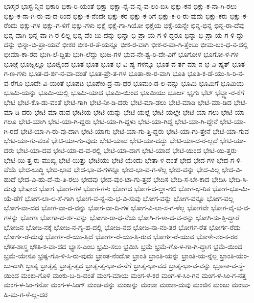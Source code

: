 {ಭಾಸ್ಕರ
ಭಾಸ್ಟ-ನ್ನಿನ
ಭಿಕಾರಿ
ಭಿಕಾ-ರಿ-ಯಂತೆ
ಭಿಕ್ಷಾ
ಭಿಕ್ಷಾ-ನ್ನ-ವ-ನ್ನ-ವ-ಲಂ-ಬಿಸಿ
ಭಿಕ್ಷು-ಕನ
ಭಿಕ್ಷು-ಕ-ನಾ-ಗಿ-ರಲು
ಭಿಕ್ಷು-ಕ-ನಾ-ಗಿ-ರು-ವು-ದ-ರಿಂದ
ಭಿಕ್ಷು-ಕ-ನೆಂದೇ
ಭಿಕ್ಷು-ಕರ
ಭಿಕ್ಷು-ಕ-ರಿಗೆ
ಭಿಕ್ಷು-ಕ-ರಿ-ರು-ವುದು
ಭಿಕ್ಷು-ಕರು
ಭಿಕ್ಷು-ಕ-ರೆಂದು
ಭಿಕ್ಷು-ಗಳ
ಭಿಕ್ಷು-ಗ-ಳಿಗೆ
ಭಿಕ್ಷು-ಗಳು
ಭಿಕ್ಷೆ
ಭಿಕ್ಷೆ-ಗಾ-ಗಿಯೋ
ಭಿಕ್ಷೆಯ
ಭಿಕ್ಷೆ-ಯನ್ನೇ
ಭಿನ್ನ-ಭಿನ್ನ
ಭಿನ್ನ-ರಾ-ದೆವು
ಭಿನ್ನ-ವಾಗಿ
ಭಿನ್ನ-ವಾ-ಗಿ-ರ-ಲಿಲ್ಲ
ಭಿನ್ನ-ವೆಂ-ಬು-ದನ್ನು
ಭಿನ್ನಾ-ಭಿ-ಪ್ರಾ-ಯ-ಗ-ಳಿ-ದ್ದರೂ
ಭಿನ್ನಾ-ಭಿ-ಪ್ರಾ-ಯ-ಗ-ಳಿ-ದ್ದು-ದನ್ನು
ಭಿನ್ನಾ-ಭಿ-ಪ್ರಾ-ಯವೆ
ಭೀಕರ
ಭೀಕ-ರ-ತೆ-ಯನ್ನೂ
ಭೀಕ-ರ-ವಾಗಿ
ಭೀಕ-ರ-ವಾ-ಗಿ-ತ್ತೆಂಬು
ಭೀಮ-ಬಂ-ಧ-ನ-ದಲ್ಲಿ
ಭೀಮಾ-ಕಾ-ರದ
ಭುಗಿ-ಲೆ-ದ್ದಿತು
ಭುಗಿ-ಲೆದ್ದು
ಭುಜ-ಗಳ
ಭುವ-ನೇ-ಶ್ವ-ರಿ-ದೇ-ವಿಗೆ
ಭೂಗೋಳ
ಭೂಗೋ-ಳ-ಗಳ
ಭೂಜ್ಗೆ
ಭೂಜ್ನಲ್ಲೂ
ಭೂಜ್ನಿಂದ
ಭೂತ
ಭೂತ
ಭೂತ-ಭ-ವಿ-ಷ್ಯ-ಗಳನ್ನೂ
ಭೂತ-ವ-ರ್ತ-ಮಾ-ನ-ಭ-ವಿ-ಷ್ಯತ್
ಭೂತ-ಗ-ಣ-ಗಳು
ಭೂತ-ದ-ರ್ಶ-ನ-ವಾ-ದಂತೆ
ಭೂತ-ಪ್ರೇ-ತ-ಗಳ
ಭೂತಾ-ಕಾ-ರ-ವಾಗಿ
ಭೂತಿ
ಭೂತಿ-ಕ-ಡೆ-ಯು-ಸಿ-ರಿ-ನ-ವ-ರೆಗೂ
ಭೂದೇ-ವಿ-ಯಂತೆ
ಭೂಪಟ
ಭೂಪೇಂ-ದ್ರ-ನಾ-ಥರ
ಭೂಮಂ-ಡ-ಲ-ವನ್ನು
ಭೂಮಿ
ಭೂಮಿಗೆ
ಭೂಮಿಯ
ಭೂಮಿ-ಯನ್ನು
ಭೂಮಿ-ಯಲ್ಲಿ
ಭೂಮಿ-ಯಾದ
ಭೂಮಿ-ಯಿಂದ
ಭೂಮಿಯು
ಭೂರ್ಜ
ಭೃಗು
ಭೆಟ್
ಭೆಟ್ದ್ವಾ-ರ-ಕೆಗೆ
ಭೇಟಿ
ಭೇಟಿ-ಕೊ-ಡು-ವಂತೆ
ಭೇಟಿ-ಗಾಗಿ
ಭೇಟಿ-ನೀ-ಡಿ-ದರು
ಭೇಟಿ-ಮಾ-ಡಲು
ಭೇಟಿ-ಮಾಡಿ
ಭೇಟಿ-ಮಾ-ಡಿದ
ಭೇಟಿ-ಮಾ-ಡಿ-ದರು
ಭೇಟಿ-ಮಾ-ಡುವ
ಭೇಟಿಯ
ಭೇಟಿ-ಯನ್ನು
ಭೇಟಿ-ಯಲ್ಲೆ
ಭೇಟಿ-ಯಲ್ಲೇ
ಭೇಟಿ-ಯಾ-ಗಲು
ಭೇಟಿ-ಯಾ-ಗಲೂ
ಭೇಟಿ-ಯಾಗಿ
ಭೇಟಿ-ಯಾ-ಗಿ-ದ್ದರು
ಭೇಟಿ-ಯಾ-ಗಿ-ದ್ದಳು
ಭೇಟಿ-ಯಾ-ಗಿದ್ದೆ
ಭೇಟಿ-ಯಾ-ಗಿ-ದ್ದೇನೆ
ಭೇಟಿ-ಯಾ-ಗಿ-ರದೆ
ಭೇಟಿ-ಯಾ-ಗಿ-ರು-ವು-ದಾಗಿ
ಭೇಟಿ-ಯಾಗು
ಭೇಟಿ-ಯಾ-ಗು-ತ್ತಿ-ದ್ದರು
ಭೇಟಿ-ಯಾ-ಗು-ತ್ತೇನೆ
ಭೇಟಿ-ಯಾ-ಗುವ
ಭೇಟಿ-ಯಾ-ಗು-ವಂತೆ
ಭೇಟಿ-ಯಾ-ಗು-ವುದು
ಭೇಟಿ-ಯಾದ
ಭೇಟಿ-ಯಾ-ದದ್ದು
ಭೇಟಿ-ಯಾ-ದ-ರ-ಲ್ಲದೆ
ಭೇಟಿ-ಯಾ-ದರು
ಭೇಟಿ-ಯಾ-ದವ
ಭೇಟಿ-ಯಾ-ದ-ವ-ರಲ್ಲಿ
ಭೇಟಿ-ಯಾ-ದಾಗ
ಭೇಟಿ-ಯಾದೆ
ಭೇಟಿ-ಯಿಂದ
ಭೇಟಿ-ಯಿ-ತ್ತರು
ಭೇಟಿ-ಯಿ-ತ್ತ-ರು-ಮುಖ್ಯ
ಭೇಟಿ-ಯಿತ್ತು
ಭೇಟಿಯು
ಭೇಟಿ-ಯೆಂದು
ಭೇತಾ-ಳ-ದಂತೆ
ಭೇದ
ಭೇದ-ಗಳ
ಭೇದ-ಗ-ಳಿ-ವೆಯೆ
ಭೇದ-ಬುದ್ಧಿ
ಭೇದ-ಭಾವ
ಭೇದ-ಭಾ-ವ-ಗಳನ್ನೂ
ಭೇದ-ಭಾ-ವ-ಗ-ಳೆಲ್ಲ
ಭೇದ-ವನ್ನು
ಭೇದ-ವಿಲ್ಲ
ಭೇದ-ವಿ-ಹುದೆ
ಭೇದ-ವಿ-ಹು-ದೆ-ನು-ತಿ-ರಲು
ಭೇದವು
ಭೇದ-ವುಂ-ಟಾ-ಗು-ತ್ತದೆ
ಭೇದಿಸ
ಭೇದಿ-ಸ-ಬೇ-ಕಾದ
ಭೇದಿಸಿ
ಭೇದಿ-ಸಿ-ದುವು
ಭೇಷಾದ
ಭೋಗ
ಭೋಗ-ಗಳ
ಭೋಗ-ಗಳು
ಭೋಗದ
ಭೋಗ-ದ-ಲ್ಲಾ-ಗಲಿ
ಭೋಗ-ಭ-ರಿತ
ಭೋಗ-ಭೂ-ಮಿ-ಯೆ-ಡೆಗೆ
ಭೋಗ-ಲಾ-ಲ-ಸೆ-ಗಾಗಿ
ಭೋಗ-ವ-ನ್ನ-ನು-ಭ-ವಿ-ಸುವು
ಭೋಗ-ವನ್ನು
ಭೋಗ-ವನ್ನೂ
ಭೋಗ-ವಲ್ಲ
ಭೋಗ-ವಾ-ದದ
ಭೋಗ-ವಾ-ದ-ವನ್ನು
ಭೋಗ-ವಾ-ದಿ-ಗಳ
ಭೋಗ-ವಿ-ಲಾ-ಸ-ಗ-ಳೆಲ್ಲ
ಭೋಗವೇ
ಭೋಗ-ವೈ-ಭ-ವ-ಗಳನ್ನು
ಭೋಗಾ
ಭೋಗಾ-ದ-ರ್ಶ-ವನ್ನು
ಭೋಗಾ-ರಾ-ಧ-ನೆಯ
ಭೋಗಿ-ಗ-ಳಾ-ದ-ವ-ರನ್ನು
ಭೋಗಿ-ಸು-ತ್ತಿ-ದ್ದಾರೆ
ಭೋಜನ
ಭೋಜ-ನಕ್ಕೆ
ಭೋಜ-ನ-ಗೃ-ಹ-ದಲ್ಲಿ
ಭೋಜ-ನದ
ಭೋಜ-ನಾ-ನಂ-ತರ
ಭೋರ್ಗ-ರೆತ
ಭೋರ್ಗ-ರೆದು
ಭೋರ್ಗ-ರೆ-ದುವು
ಭೋರ್ಗ-ರೆ-ಯು-ತ್ತಿದೆ
ಭೋರ್ಗ-ರೆ-ಯು-ತ್ತಿ-ರುವ
ಭೋರ್ಗ-ರೆ-ಯುವ
ಭೋಳೇ-ಶಂ-ಕ-ರರ
ಭೌತ-ಶಾಸ್ತ್ರ
ಭೌತಿ-ಕ-ವಾ-ದದ
ಭ್ಯಾಸ-ಎಂಬ
ಭ್ರಮಿ-ಸಲು
ಭ್ರಮಿಸಿ
ಭ್ರಮೆ
ಭ್ರಮೆ-ಗೊ-ಳ-ಗಾ-ಗಿ-ದ್ದಾಗ
ಭ್ರಮೆ-ಯಿಂದ
ಭ್ರಮೆ-ಯೇನೂ
ಭ್ರಷ್ಟ-ಗೊ-ಳಿ-ಸಿ-ರು-ವುದು
ಭ್ರಾಂತ-ನೆಂದೋ
ಭ್ರಾಂತಿ
ಭ್ರಾಂತಿ-ಯನ್ನು
ಭ್ರಾಂತಿ-ಯ-ನ್ನೆಲ್ಲ
ಭ್ರಾಂತಿ-ಯೆಂ-ಬು-ದಾಗಿ
ಭ್ರಾತೃ
ಭ್ರಾತೃತ್ವ
ಭ್ರಾತೃ-ತ್ವದ
ಭ್ರಾತೃ-ತ್ವ-ಭಾ-ವ-ನೆಗೆ
ಭ್ರಾತೃ-ಭಾ-ವದ
ಭ್ರಾತೃ-ಭಾ-ವ-ವನ್ನು
ಭ್ರೂಣಾ-ವ-ಸ್ಥೆ-ಯಿಂದ
ಮಂಕು-ಗೊಳಿ
ಮಂಕು-ಬ-ಡಿ-ದಂತೆ
ಮಂಗ-ಮಾಯ
ಮಂಗ-ಳ-ಕರ
ಮಂಗ-ಳ-ಸಿಂ-ಗನ
ಮಂಗ-ಳ-ಸಿಂ-ಗ-ನತ್ತ
ಮಂಗ-ಳ-ಸಿಂ-ಗನೋ
ಮಂಗ-ಳ-ಸಿಂಗ್
ಮಂಚ-ವನ್ನು
ಮಂಜನ್ನು
ಮಂಜಾ
ಮಂಜಾ-ದುವು
ಮಂಜಿನ
ಮಂಜು
ಮಂಜು-ಹಿ-ಮ-ಗ-ಳೆ-ಲ್ಲ-ದರ
}
